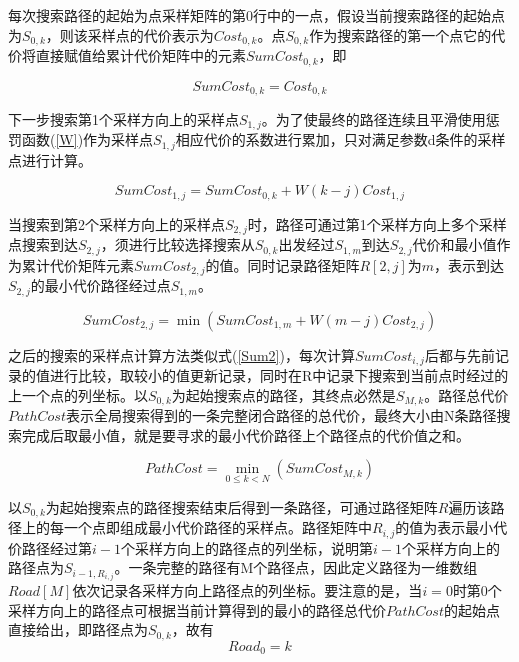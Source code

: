 \documentclass[nomlist,masters]{seuthesix}
\begin{document}
每次搜索路径的起始为点采样矩阵的第0行中的一点，假设当前搜索路径的起始点为$S_{0,k}$，则该采样点的代价表示为$Cost_{0,k}$。点$S_{0,k}$作为搜索路径的第一个点它的代价将直接赋值给累计代价矩阵中的元素$SumCost_{0,k}$，即

\begin{equation}
SumCost_{0,k}=Cost_{0,k}
\label{Sum0}
\end{equation}

下一步搜索第1个采样方向上的采样点$S_{1,j}$。为了使最终的路径连续且平滑使用惩罚函数(\ref{W})作为采样点$S_{1,j}$相应代价的系数进行累加，只对满足参数d条件的采样点进行计算。

\begin{equation}
SumCost_{1,j}=SumCost_{0,k}+W(k-j)Cost_{1,j}
\label{Sum1}
\end{equation}

当搜索到第2个采样方向上的采样点$S_{2,j}$时，路径可通过第1个采样方向上多个采样点搜索到达$S_{2,j}$，须进行比较选择搜索从$S_{0,k}$出发经过$S_{1,m}$到达$S_{2,j}$代价和最小值作为累计代价矩阵元素$SumCost_{2,j}$的值。同时记录路径矩阵$R[2,j]$为$m$，表示到达$S_{2,j}$的最小代价路径经过点$S_{1,m}$。

\begin{equation}
SumCost_{2,j}=\min \left ( SumCost_{1,m}+W(m-j)Cost_{2,j} \right )
\label{Sum2}
\end{equation}

之后的搜索的采样点计算方法类似式(\ref{Sum2})，每次计算$SumCost_{i,j}$后都与先前记录的值进行比较，取较小的值更新记录，同时在R中记录下搜索到当前点时经过的上一个点的列坐标。以$S_{0,k}$为起始搜索点的路径，其终点必然是$S_{M,k}$。路径总代价$PathCost$表示全局搜索得到的一条完整闭合路径的总代价，最终大小由N条路径搜索完成后取最小值，就是要寻求的最小代价路径上个路径点的代价值之和。

\begin{equation}
PathCost=\min_{0\leqslant k < N} \left ( SumCost_{M,k} \right )
\label{PathCost}
\end{equation}

以$S_{0,k}$为起始搜索点的路径搜索结束后得到一条路径，可通过路径矩阵$R$遍历该路径上的每一个点即组成最小代价路径的采样点。路径矩阵中$R_{i,j}$的值为表示最小代价路径经过第$i-1$个采样方向上的路径点的列坐标，说明第$i-1$个采样方向上的路径点为$S_{i-1,R_{i,j}}$。一条完整的路径有M个路径点，因此定义路径为一维数组$Road[M]$依次记录各采样方向上路径点的列坐标。要注意的是，当$i=0$时第0个采样方向上的路径点可根据当前计算得到的最小的路径总代价$PathCost$的起始点直接给出，即路径点为$S_{0,k}$，故有
\begin{equation}
Road_{0}=k
\label{Road0}
\end{equation}
\end{document}
